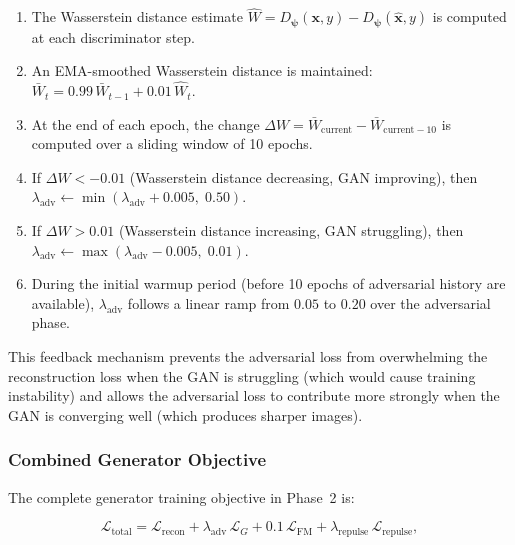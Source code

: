 \documentclass[12pt,letterpaper]{article}
\newcommand{\bx}{\mathbf{x}}
\newcommand{\bpsi}{\bm{\psi}}
\begin{document}
\begin{enumerate}[label=\textbf{(\arabic*)},leftmargin=2em]
  \item The Wasserstein distance estimate
    $\hat{W} = D_{\bpsi}(\bx, y) - D_{\bpsi}(\hat{\bx}, y)$ is computed
    at each discriminator step.

  \item An EMA-smoothed Wasserstein distance is maintained:
    $\bar{W}_t = 0.99\,\bar{W}_{t-1} + 0.01\,\hat{W}_t$.

  \item At the end of each epoch, the change
    $\Delta W = \bar{W}_{\text{current}} - \bar{W}_{\text{current}-10}$ is
    computed over a sliding window of 10 epochs.

  \item If $\Delta W < -0.01$ (Wasserstein distance decreasing, GAN
    improving), then $\lambda_{\text{adv}} \leftarrow
    \min(\lambda_{\text{adv}} + 0.005,\; 0.50)$.

  \item If $\Delta W > 0.01$ (Wasserstein distance increasing, GAN
    struggling), then $\lambda_{\text{adv}} \leftarrow
    \max(\lambda_{\text{adv}} - 0.005,\; 0.01)$.

  \item During the initial warmup period (before 10 epochs of adversarial
    history are available), $\lambda_{\text{adv}}$ follows a linear ramp
    from $0.05$ to $0.20$ over the adversarial phase.
\end{enumerate}

This feedback mechanism prevents the adversarial loss from overwhelming the
reconstruction loss when the GAN is struggling (which would cause training
instability) and allows the adversarial loss to contribute more strongly
when the GAN is converging well (which produces sharper images).

\subsubsection{Combined Generator Objective}

The complete generator training objective in Phase~2 is:

\begin{equation}
  \mathcal{L}_{\text{total}} =
    \mathcal{L}_{\text{recon}}
    + \lambda_{\text{adv}}\,\mathcal{L}_G
    + 0.1\,\mathcal{L}_{\text{FM}}
    + \lambda_{\text{repulse}}\,\mathcal{L}_{\text{repulse}},
  \label{eq:total}
\end{equation}
\end{document}
